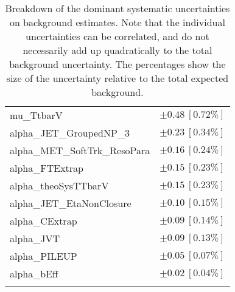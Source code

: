 \begin{table}
\begin{center}
\begin{tabular*}{\textwidth}{@{\extracolsep{\fill}}lc}
mu\_TtbarV         & $\pm 0.48\ [0.72\%] $       \\
alpha\_JET\_GroupedNP\_3         & $\pm 0.23\ [0.34\%] $       \\
alpha\_MET\_SoftTrk\_ResoPara         & $\pm 0.16\ [0.24\%] $       \\
alpha\_FTExtrap         & $\pm 0.15\ [0.23\%] $       \\
alpha\_theoSysTTbarV         & $\pm 0.15\ [0.23\%] $       \\
alpha\_JET\_EtaNonClosure         & $\pm 0.10\ [0.15\%] $       \\
alpha\_CExtrap         & $\pm 0.09\ [0.14\%] $       \\
alpha\_JVT         & $\pm 0.09\ [0.13\%] $       \\
alpha\_PILEUP         & $\pm 0.05\ [0.07\%] $       \\
alpha\_bEff         & $\pm 0.02\ [0.04\%] $       \\
\noalign{\smallskip}\hline\noalign{\smallskip}
\end{tabular*}
\end{center}
\caption[Breakdown of uncertainty on background estimates]{
Breakdown of the dominant systematic uncertainties on background estimates.
Note that the individual uncertainties can be correlated, and do not necessarily add up quadratically to 
the total background uncertainty. The percentages show the size of the uncertainty relative to the total expected background.
\label{table.results.bkgestimate.uncertainties.VRZD}}
\end{table}
%